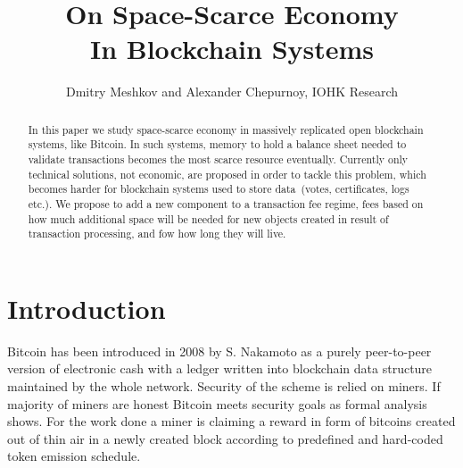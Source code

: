 \documentclass[]{article}   %
\begin{document}
\title{On Space-Scarce Economy\\ In Blockchain Systems}
\author{Dmitry Meshkov and Alexander Chepurnoy, IOHK Research}
\maketitle

\begin{abstract}
In this paper we study space-scarce economy in massively replicated open blockchain systems, like Bitcoin. In such systems, memory to hold a balance sheet needed to validate transactions becomes the most scarce resource eventually. Currently only technical solutions, not economic, are proposed in order to tackle this problem, which becomes harder for blockchain systems used to store data~(votes, certificates, logs etc.). We propose to add a new component to a transaction fee regime, fees based on how much additional space will be needed for new objects created in result of transaction processing, and fow how long they will live.    
\end{abstract}

\section{Introduction}

Bitcoin \cite{Nakamoto2008} has been introduced in 2008 by S. Nakamoto as a purely peer-to-peer version of electronic cash with a ledger written into blockchain data structure maintained by the whole network. Security of the scheme is relied on miners. If majority of miners are honest Bitcoin meets security goals as formal analysis~\cite{Garay2015} shows. For the work done a miner is claiming a reward in form of bitcoins created out of thin air in a newly created block according to predefined and hard-coded token emission schedule. 


\end{document}
